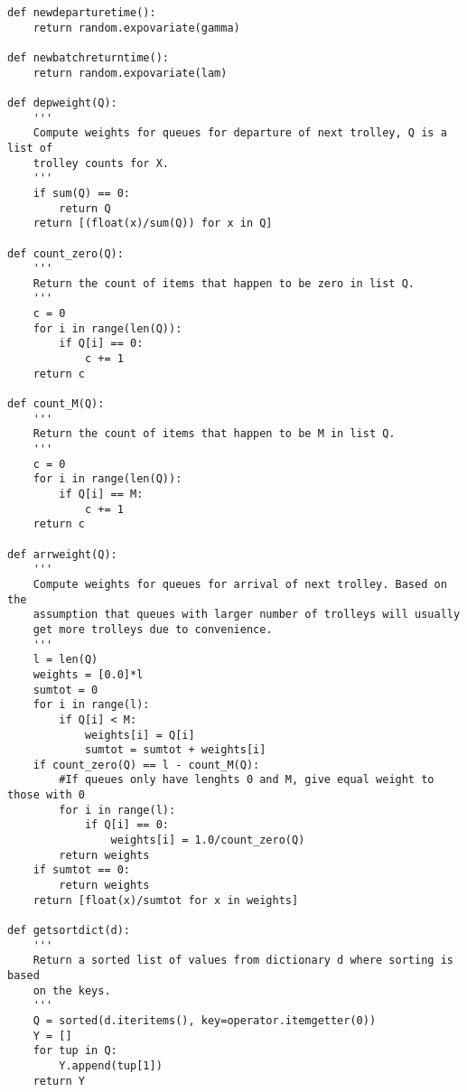 \documentclass[english]{article}
\begin{document}
\begin{singlespace}
\begin{verbatim}
def newdeparturetime():
    return random.expovariate(gamma)

def newbatchreturntime():
    return random.expovariate(lam)

def depweight(Q):
    '''
    Compute weights for queues for departure of next trolley, Q is a list of
    trolley counts for X.
    '''
    if sum(Q) == 0:
        return Q
    return [(float(x)/sum(Q)) for x in Q]

def count_zero(Q):
    '''
    Return the count of items that happen to be zero in list Q.
    '''
    c = 0
    for i in range(len(Q)):
        if Q[i] == 0:
            c += 1
    return c

def count_M(Q):
    '''
    Return the count of items that happen to be M in list Q.
    '''
    c = 0
    for i in range(len(Q)):
        if Q[i] == M:
            c += 1
    return c

def arrweight(Q):
    '''
    Compute weights for queues for arrival of next trolley. Based on the
    assumption that queues with larger number of trolleys will usually
    get more trolleys due to convenience.
    '''
    l = len(Q)
    weights = [0.0]*l
    sumtot = 0
    for i in range(l):
        if Q[i] < M:
            weights[i] = Q[i]
            sumtot = sumtot + weights[i]
    if count_zero(Q) == l - count_M(Q):  
        #If queues only have lenghts 0 and M, give equal weight to those with 0
        for i in range(l):
            if Q[i] == 0:
                weights[i] = 1.0/count_zero(Q)
        return weights
    if sumtot == 0:
        return weights
    return [float(x)/sumtot for x in weights]

def getsortdict(d):
    '''
    Return a sorted list of values from dictionary d where sorting is based
    on the keys.
    '''
    Q = sorted(d.iteritems(), key=operator.itemgetter(0))
    Y = []
    for tup in Q:
        Y.append(tup[1])
    return Y
\end{verbatim}
\end{singlespace}
\pagebreak
\end{document}
